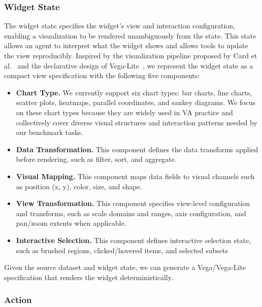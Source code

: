 \subsubsection{Widget State}

The widget state specifies the widget's view and interaction configuration, enabling a visualization to be rendered unambiguously from the state.
This state allows an agent to interpret what the widget shows and allows tools to update the view reproducibly.
Inspired by the visualization pipeline proposed by Card et al.~\cite{card1999readings} and the declarative design of Vega-Lite~\cite{Satyanarayan2017VegaLite}, we represent the widget state as a compact view specification with the following five components:
\begin{itemize}[nosep]
\item \textbf{Chart Type.} We currently support six chart types: bar charts, line charts, scatter plots, heatmaps, parallel coordinates, and sankey diagrams.
We focus on these chart types because they are widely used in VA practice and collectively cover diverse visual structures and interaction patterns needed by our benchmark tasks.
\item \textbf{Data Transformation.} This component defines the data transforms applied before rendering, such as filter, sort, and aggregate.
\item \textbf{Visual Mapping.} This component maps data fields to visual channels such as position (x, y), color, size, and shape.
\item \textbf{View Transformation.} This component specifies view-level configuration and transforms, such as scale domains and ranges, axis configuration, and pan/zoom extents when applicable.
\item \textbf{Interactive Selection.} This component defines interactive selection state, such as brushed regions, clicked/hovered items, and selected subsets
\end{itemize}

Given the source dataset and widget state, we can generate a Vega/Vega-Lite specification that renders the widget deterministically.





\subsubsection{Action}
\label{sec:action-api}

